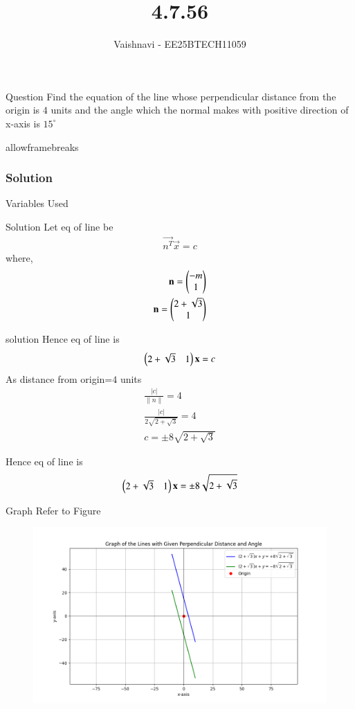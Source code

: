 \documentclass{beamer}
\title %
{4.7.56}
\author %
{Vaishnavi - EE25BTECH11059}
\begin{document}
\frame{\titlepage}
\begin{frame}{Question}
Find the equation of the line whose perpendicular distance from the origin is $4$ units and the angle which the normal makes with positive direction of x-axis is $15^\circ$
\end{frame}
\begin{frame}{allowframebreaks}
\frametitle{Solution}
\begin{table}[H]    
  \centering
  
  \caption{Variables Used}
  \label{tab:1.10.2}
\end{table}

\end{frame}


\begin{frame}{Solution}
Let eq of line be
\begin{align}
\vec{n^T}\vec{x}=c
\end{align}
where,
\begin{align}
\mathbf{n}=\begin{pmatrix}-m
               \\
               1\end{pmatrix}\\
\mathbf{n}=\begin{pmatrix}2+\sqrt{3}
                \\
                1\end{pmatrix}
\end{align}
\end{frame}

\begin{frame}{solution}
Hence eq of line is
\begin{align}
\begin{pmatrix}2+\sqrt{3}&1\end{pmatrix}
\mathbf{x}
=c\\
\end{align}
As distance from origin=$4$ units
\begin{align}
    \frac{|c|}{\|n\|}=4\\
    \frac{|c|}{2\sqrt{2+\sqrt{3}}}=4\\
    c=\pm 8\sqrt{2+\sqrt{3}}
\end{align}   


Hence eq of line is 
\begin{align}
 \begin{pmatrix}2+\sqrt{3}&1\end{pmatrix}
\mathbf{x}
= \pm 8 \sqrt{2 + \sqrt{3}}
\end{align}
\end{frame}
\begin{frame}{Graph}
   Refer to Figure

\begin{figure}[H]
\begin{center}
\includegraphics[width=0.6\columnwidth]{../figs/graph7.png}
\end{center}
\caption{}
\label{fig:Fig}
\end{figure}  
\end{frame}
\end{document}
